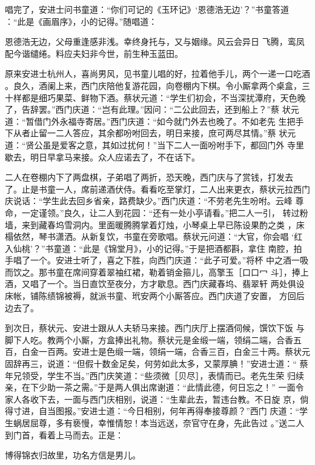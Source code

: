 唱完了，安进士问书童道：“你们可记的《玉环记》‘恩德浩无边’？”书童答道
：“此是《画眉序》，小的记得。”随唱道：

恩德浩无边，父母重逢感非浅。幸终身托与，又与姻缘。风云会异日
飞腾，鸾凤配今谐缱绻。料应夫妇非今世，前生种玉蓝田。

原来安进士杭州人，喜尚男风，见书童儿唱的好，拉着他手儿，两个一递一口吃酒
。良久，酒阑上来，西门庆陪他复游花园，向卷棚内下棋。令小厮拿两个桌盒，三
十样都是细巧果菜、鲜物下酒。蔡状元道：“学生们初会，不当深扰潭府，天色晚
了，告辞罢。”西门庆道：“岂有此理。”因问：“二公此回去，还到船上？”蔡
状元道：“暂借门外永福寺寄居。”西门庆道：“如今就门外去也晚了。不如老先
生把手下从者止留一二人答应，其余都吩咐回去，明日来接，庶可两尽其情。”蔡
状元道：“贤公虽是爱客之意，其如过扰何！”当下二人一面吩咐手下，都回门外
寺里歇去，明日早拿马来接。众人应诺去了，不在话下。

二人在卷棚内下了两盘棋，子弟唱了两折，恐天晚，西门庆与了赏钱，打发去
了。止是书童一人，席前递酒伏侍。看看吃至掌灯，二人出来更衣，蔡状元拉西门
庆说话：“学生此去回乡省亲，路费缺少。”西门庆道：“不劳老先生吩咐。云峰
尊命，一定谨领。”良久，让二人到花园：“还有一处小亭请看。”把二人一引，
转过粉墙，来到藏春坞雪洞内。里面暖腾腾掌着灯烛，小琴桌上早已陈设果酌之类
，床榻依然，琴书潇洒。从新复饮，书童在旁歌唱。蔡状元问道：“大官，你会唱
‘红入仙桃’？”书童道：“此是《锦堂月》，小的记得。”于是把酒都斟，拿住
南腔，拍手唱了一个。安进士听了，喜之下胜，向西门庆道：“此子可爱。”将杯
中之酒一吸而饮之。那书童在席间穿着翠袖红裙，勒着销金箍儿，高擎玉［口口冖
斗］，捧上酒，又唱了一个。当日直饮至夜分，方才歇息。西门庆藏春坞、翡翠轩
两处俱设床帐，铺陈绩锦被褥，就派书童、玳安两个小厮答应。西门庆道了安置，
方回后边去了。

到次日，蔡状元、安进士跟从人夫轿马来接。西门庆厅上摆酒伺候，馔饮下饭
与脚下人吃。教两个小厮，方盒捧出礼物。蔡状元是金缎一端，领绢二端，合香五
百，白金一百两。安进士是色缎一端，领绢一端，合香三百，白金三十两。蔡状元
固辞再三，说道：“但假十数金足矣，何劳如此太多，又蒙厚腆！”安进士道：“
蔡年兄领受，学生不当。”西门庆笑道：“些须微［贝尽］，表情而已。老先生荣
归续亲，在下少助一茶之需。”于是两人俱出席谢道：“此情此德，何日忘之！”
一面令家人各收下去，一面与西门庆相别，说道：“生辈此去，暂违台教。不日旋
京，倘得寸进，自当图报。”安进士道：“今日相别，何年再得奉接尊颜？”西门
庆道：“学生蜗居屈尊，多有亵慢，幸惟情恕！本当远送，奈官守在身，先此告过
。”送二人到门首，看着上马而去。正是：

博得锦衣归故里，功名方信是男儿。